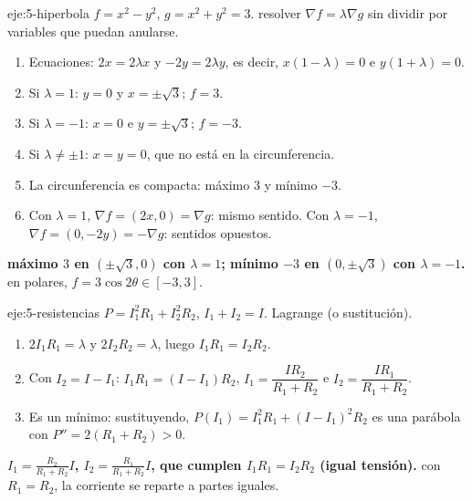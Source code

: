 \begin{solucion}{eje:5-hiperbola}
\datos $f=x^2-y^2$, $g=x^2+y^2=3$.
\planteamiento resolver $\nabla f=\lambda\nabla g$ sin dividir por variables que puedan anularse.
\pasos
\begin{enumerate}[label=\arabic*.]
  \item Ecuaciones: $2x=2\lambda x$ y $-2y=2\lambda y$, es decir, $x(1-\lambda)=0$ e $y(1+\lambda)=0$.
  \item Si $\lambda=1$: $y=0$ y $x=\pm\sqrt3$; $f=3$.
  \item Si $\lambda=-1$: $x=0$ e $y=\pm\sqrt3$; $f=-3$.
  \item Si $\lambda\neq\pm1$: $x=y=0$, que no está en la circunferencia.
  \item La circunferencia es compacta: máximo $3$ y mínimo $-3$.
  \item Con $\lambda=1$, $\nabla f=(2x,0)=\nabla g$: mismo sentido. Con $\lambda=-1$, $\nabla f=(0,-2y)=-\nabla g$: sentidos opuestos.
\end{enumerate}
\resultado \textbf{máximo $3$ en $(\pm\sqrt3,0)$ con $\lambda=1$; mínimo $-3$ en $(0,\pm\sqrt3)$ con $\lambda=-1$.}
\comprobacion en polares, $f=3\cos2\theta\in[-3,3]$.
\end{solucion}

\begin{solucion}{eje:5-resistencias}
\datos $P=I_1^2R_1+I_2^2R_2$, $I_1+I_2=I$.
\planteamiento Lagrange (o sustitución).
\pasos
\begin{enumerate}[label=\arabic*.]
  \item $2I_1R_1=\lambda$ y $2I_2R_2=\lambda$, luego $I_1R_1=I_2R_2$.
  \item Con $I_2=I-I_1$: $I_1R_1=(I-I_1)R_2$, $I_1=\dfrac{IR_2}{R_1+R_2}$ e $I_2=\dfrac{IR_1}{R_1+R_2}$.
  \item Es un mínimo: sustituyendo, $P(I_1)=I_1^2R_1+(I-I_1)^2R_2$ es una parábola con $P''=2(R_1+R_2)>0$.
\end{enumerate}
\resultado \textbf{$I_1=\frac{R_2}{R_1+R_2}I$, $I_2=\frac{R_1}{R_1+R_2}I$, que cumplen $I_1R_1=I_2R_2$ (igual tensión).}
\comprobacion con $R_1=R_2$, la corriente se reparte a partes iguales.
\end{solucion}

